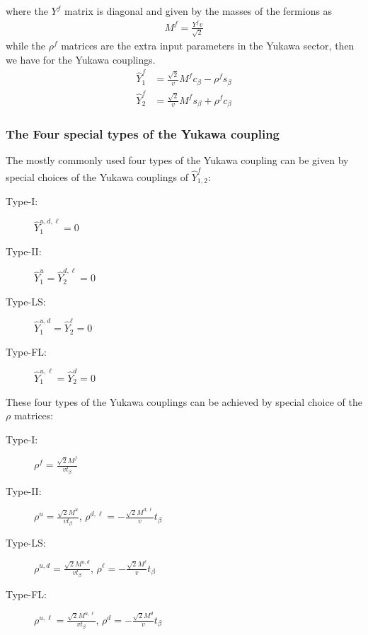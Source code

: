 \documentclass[12pt]{article}
\begin{document}
where the $Y^f$ matrix is diagonal and given by the masses of the fermions as
\begin{align}
M^{f} = \frac{Y^{f}v}{\sqrt{ 2 }}
\end{align}
while the $\rho^f$ matrices are the extra input parameters in the Yukawa sector, then we have for the Yukawa couplings.
\begin{align}
\hat{Y}_{1}^{f} &= \frac{\sqrt{ 2 }}{v} M^{f} c_{\beta}-\rho^{f}s_{\beta}\\
\hat{Y}_{2}^{f} &= \frac{\sqrt{ 2 }}{v} M^{f} s_{\beta}+\rho^{f}c_{\beta}
\end{align}

\subsubsection{The Four special types of the Yukawa coupling}
The mostly commonly used four types of the Yukawa coupling can be given by special choices of the Yukawa couplings of $\hat{Y}_{1,2}^f$:
\begin{description}
    \item[Type-I:] $\hat{Y}_{1}^{u,d,\ell}=0$
    \item[Type-II:] $\hat{Y}_{1}^u=\hat{Y}_2^{d,\ell}=0$
    \item[Type-LS:] $\hat{Y}_1^{u,d}=\hat{Y}_2^{\ell}=0$
    \item[Type-FL:] $\hat{Y}_1^{u,\ell}=\hat{Y}_2^{d}=0$
\end{description}
These four types of the Yukawa couplings can be achieved by special choice of the $\rho$ matrices:
\begin{description}
    \item[Type-I:] $\rho^f=\frac{\sqrt{2}M^f}{vt_\beta}$
    \item[Type-II:] $\rho^u=\frac{\sqrt{2}M^u}{vt_\beta}$, $\rho^{d,\ell}=-\frac{\sqrt{2}M^{d,\ell}}{v}t_\beta$
    \item[Type-LS:] $\rho^{u,d}=\frac{\sqrt{2}M^{u,d}}{vt_\beta}$, $\rho^{\ell}=-\frac{\sqrt{2}M^{\ell}}{v}t_\beta$
    \item[Type-FL:] $\rho^{u,\ell}=\frac{\sqrt{2}M^{u,\ell}}{vt_\beta}$, $\rho^{d}=-\frac{\sqrt{2}M^d}{v}t_\beta$
\end{description}


% 
% 
\end{document}
